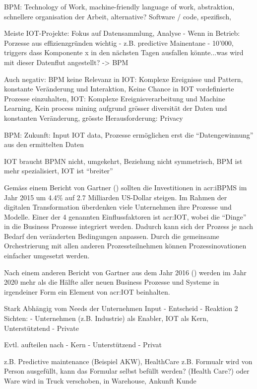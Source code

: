 BPM: Technology of Work, machine-friendly language of work, abstraktion, schnellere organisation der Arbeit, alternative? Software / code, spezifisch,

Meiste IOT-Projekte: Fokus auf Datensammlung, Analyse - Wenn in Betrieb: Porzesse aus effizienzgründen wichtig - z.B. predictive Mainentane - 10'000, triggers dass Komponente x in den nächsten Tagen ausfallen könnte...was wird mit dieser Datenflut angestellt? -> BPM

Auch negativ: BPM keine Relevanz in IOT: Komplexe Ereignisse und Pattern, konstante Veränderung und Interaktion, Keine Chance in IOT vordefinierte Prozesse einzuhalten, IOT: Komplexe Ereignisverarbeitung und Machine Learning, Kein process mining aufgrund grösser diversität der Daten und konstanten Veränderung, grösste Herausforderung: Privacy

BPM: Zukunft: Input IOT data, Prozesse ermöglichen erst die "`Datengewinnung"' aus den ermittelten Daten

IOT braucht BPMN nicht, umgekehrt, Beziehung nicht symmetrisch, BPM ist mehr spezialisiert, IOT ist "`breiter"'

Gemäss einem Bericht von Gartner (\cite{E:Gartner:BPM:2015}) sollten die Investitionen in \gls{acr:iBPMS} im Jahr 2015 um 4.4\% auf 2.7 Milliarden US-Dollar steigen. Im Rahmen der digitalen Transformation überdenken viele Unternehmen ihre Prozesse und Modelle. Einer der 4 genannten Einflussfaktoren ist \gls{acr:IOT}, wobei die "`Dinge"' in die Business Prozesse integriert werden. Dadurch kann sich der Prozess je nach Bedarf den veränderten Bedingungen anpassen. Durch die gemeinsame Orchestrierung mit allen anderen Prozessteilnehmen können Prozessinovationen einfacher umgesetzt werden.

Nach einem anderen Bericht von Gartner aus dem Jahr 2016 (\cite{E:Gartner:BPM:IOT:2020}) werden im Jahr 2020 mehr als die Hälfte aller neuen Business Prozesse und Systeme in irgendeiner Form ein Element von \gls{acr:IOT} beinhalten.

Stark Abhängig vom Needs der Unternehmen
Input - Entscheid - Reaktion
2 Sichten:
	- Unternehmen (z.B. Industrie) als Enabler, IOT als Kern, Unterstütztend
	- Private 
	
Evtl. aufteilen nach
	- Kern
	- Unterstützend
	- Privat
	

z.B. Predictive maintenance (Beispiel AKW), HealthCare
z.B. Formualr wird von Person ausgefüllt, kann das Formular selbst befüllt werden? (Health Care?) oder Ware wird in Truck verschoben, in Warehouse, Ankunft Kunde
	

